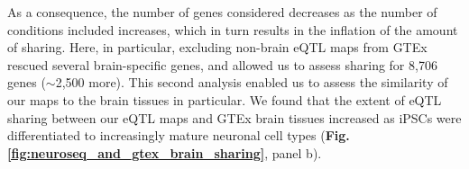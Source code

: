 As a consequence, the number of genes considered decreases as the number of conditions included increases, which in turn results in the inflation of the amount of sharing.
Here, in particular, excluding non-brain eQTL maps from GTEx rescued several brain-specific genes, and allowed us to assess sharing for 8,706 genes ($\sim$2,500 more).
This second analysis enabled us to assess the similarity of our maps to the brain tissues in particular. 
We found that the extent of eQTL sharing between our eQTL maps and GTEx brain tissues increased as iPSCs were differentiated to increasingly mature neuronal cell types (\textbf{Fig. \ref{fig:neuroseq_and_gtex_brain_sharing}}, panel b). 

